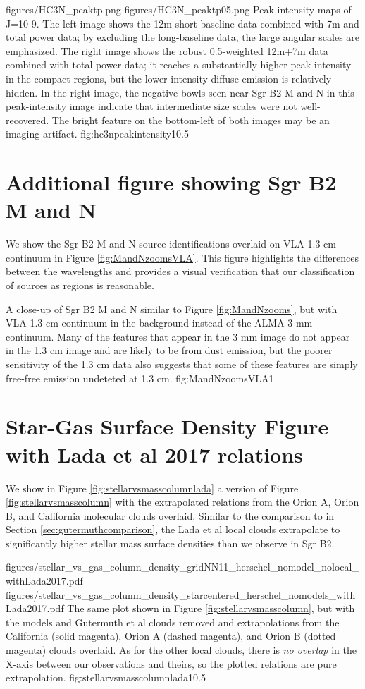 \documentclass[twocolumn]{aastex61}
\begin{document}
\FigureTwo
{figures/HC3N_peaktp.png}
{figures/HC3N_peaktp05.png}
{Peak intensity maps of \cyanoacetylene J=10-9.
The left image shows the 12m short-baseline data combined with 7m and total
power data; by excluding the long-baseline data, the large angular scales are
emphasized.  The right image shows the robust 0.5-weighted 12m+7m data combined
with total power data;
it reaches a substantially higher peak intensity in the compact regions, but
the lower-intensity diffuse emission is relatively hidden.  In the right image,
the negative bowls seen near Sgr B2 M and N in this peak-intensity image
indicate that intermediate size scales were not well-recovered.  The bright
feature on the bottom-left of both images may be an imaging artifact.}
{fig:hc3npeakintensity}{1}{0.5\textwidth}

\section{Additional figure showing Sgr B2 M and N}
\label{sec:onept3cm}
We show the Sgr B2 M and N source identifications overlaid on VLA 1.3 cm
continuum \citep{De-Pree2014a} in Figure \ref{fig:MandNzoomsVLA}.  This figure
highlights the differences between the wavelengths and provides a visual
verification that our classification of sources as \hii regions is reasonable.

{A close-up of Sgr B2 M and N similar to Figure \ref{fig:MandNzooms}, but with
VLA 1.3 cm continuum \citep{De-Pree2014a} in the background instead of the ALMA 3 mm
continuum.  Many of the features that appear in the 3 mm image do not appear
in the 1.3 cm image and are likely to be from dust emission, but the poorer sensitivity
of the 1.3 cm data also suggests that some of these features are simply 
free-free emission undeteted at 1.3 cm.}
{fig:MandNzoomsVLA}{1}{\textwidth}

\section{Star-Gas Surface Density Figure with Lada et al 2017 relations}
\label{sec:ladasurfdensappendix}
We show in Figure \ref{fig:stellarvsmasscolumnlada} a version of Figure
\ref{fig:stellarvsmasscolumn} with the extrapolated relations from the Orion A,
Orion B, and California molecular clouds overlaid.  Similar to the comparison
to \citet{Gutermuth2011a} in Section \ref{sec:gutermuthcomparison}, the Lada et
al local clouds extrapolate to significantly higher stellar mass surface
densities than we observe in Sgr B2.

\FigureTwo
{figures/stellar_vs_gas_column_density_gridNN11_herschel_nomodel_nolocal_withLada2017.pdf}
{figures/stellar_vs_gas_column_density_starcentered_herschel_nomodels_withLada2017.pdf}
{The same plot shown in Figure \ref{fig:stellarvsmasscolumn},
but with the models and Gutermuth et al clouds removed and extrapolations
from the California (solid magenta), Orion A (dashed magenta), and Orion B
(dotted magenta) clouds overlaid.  As for the other local clouds, there is
\emph{no overlap} in the X-axis between our observations and theirs, so the
plotted relations are pure extrapolation.}
{fig:stellarvsmasscolumnlada}{1}{0.5\textwidth}
\end{document}
